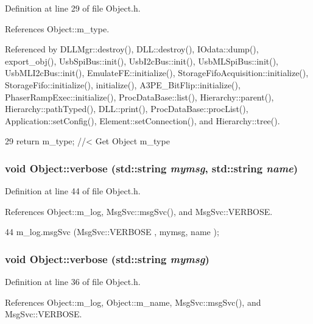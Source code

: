 Definition at line 29 of file Object.h.

References Object::m\_\-type.

Referenced by DLLMgr::destroy(), DLL::destroy(), IOdata::dump(), export\_\-obj(), UsbSpiBus::init(), UsbI2cBus::init(), UsbMLSpiBus::init(), UsbMLI2cBus::init(), EmulateFE::initialize(), StorageFifoAcquisition::initialize(), StorageFifo::initialize(), initialize(), A3PE\_\-BitFlip::initialize(), PhaserRampExec::initialize(), ProcDataBase::list(), Hierarchy::parent(), Hierarchy::pathTyped(), DLL::print(), ProcDataBase::procList(), Application::setConfig(), Element::setConnection(), and Hierarchy::tree().


\begin{DoxyCode}
29 { return m_type;       } //< Get Object m_type
\end{DoxyCode}
\hypertarget{classObject_a2d4120195317e2a3c6532e8bb9f3da68}{
\subsubsection[{verbose}]{\setlength{\rightskip}{0pt plus 5cm}void Object::verbose (std::string {\em mymsg}, \/  std::string {\em name})}}
\label{classObject_a2d4120195317e2a3c6532e8bb9f3da68}


Definition at line 44 of file Object.h.

References Object::m\_\-log, MsgSvc::msgSvc(), and MsgSvc::VERBOSE.


\begin{DoxyCode}
44 { m_log.msgSvc (MsgSvc::VERBOSE , mymsg, name ); }
\end{DoxyCode}
\hypertarget{classObject_a83d2db2df682907ea1115ad721c1c4a1}{
\subsubsection[{verbose}]{\setlength{\rightskip}{0pt plus 5cm}void Object::verbose (std::string {\em mymsg})}}
\label{classObject_a83d2db2df682907ea1115ad721c1c4a1}


Definition at line 36 of file Object.h.

References Object::m\_\-log, Object::m\_\-name, MsgSvc::msgSvc(), and MsgSvc::VERBOSE.

